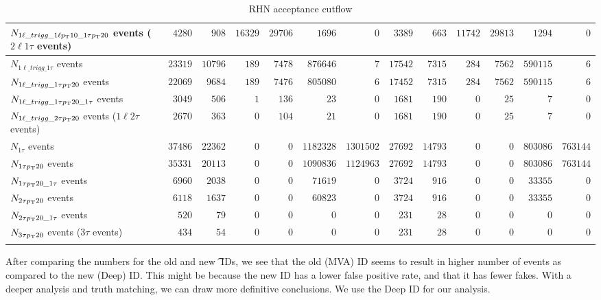 \documentclass[letterpaper,12pt]{article}
\begin{document}
\begin{table}[h]
{\begin{tabular}{l|rr|rrrr|rr|rrrr}
      \hline
      \rowcolor{red!20}
      $N_{1\ell\_trigg\_1\ell p_{\mathrm{T}}10\_1\tau p_{\mathrm{T}}20}$ events ($2\ell1\tau$ events) & $4280$ & $908$ & $16329$ & $29706$ & $1696$ & $0$ & $3389$ & $663$ & $11742$ & $29813$ & $1294$ & $0$\\
      \hline
      $N_{1\ell\_trigg\_1\tau}$ events & $23319$ & $10796$ & $189$ & $7478$ & $876646$ & $7$ & $17542$ & $7315$ & $284$ & $7562$ & $590115$ & $6$\\
      $N_{1\ell\_trigg\_1\tau p_{\mathrm{T}}20}$ events & $22069$ & $9684$ & $189$ & $7476$ & $805080$ & $6$ & $17452$ & $7315$ & $284$ & $7562$ & $590115$ & $6$\\
      $N_{1\ell\_trigg\_1\tau p_{\mathrm{T}}20\_1\tau}$ events & $3049$ & $506$ & $1$ & $136$ & $23$ & $0$ & $1681$ & $190$ & $0$ & $25$ & $7$ & $0$\\
      \hline
      \rowcolor{red!20}
      $N_{1\ell\_trigg\_2\tau p_{\mathrm{T}}20}$ events ($1\ell2\tau$ events) & $2670$ & $363$ & $0$ & $104$ & $21$ & $0$ & $1681$ & $190$ & $0$ & $25$ & $7$ & $0$\\
      \hline
      $N_{1\tau}$ events & $37486$ & $22362$ & $0$ & $0$ & $1182328$ & $1301502$ & $27692$ & $14793$ & $0$ & $0$ & $803086$ & $763144$\\
      $N_{1\tau p_{\mathrm{T}}20}$ events & $35331$ & $20113$ & $0$ & $0$ & $1090836$ & $1124963$ & $27692$ & $14793$ & $0$ & $0$ & $803086$ & $763144$\\
      $N_{1\tau p_{\mathrm{T}}20\_1\tau}$ events & $6960$ & $2038$ & $0$ & $0$ & $71619$ & $0$ & $3724$ & $916$ & $0$ & $0$ & $33355$ & $0$\\
      $N_{2\tau p_{\mathrm{T}}20}$ events & $6118$ & $1637$ & $0$ & $0$ & $60823$ & $0$ & $3724$ & $916$ & $0$ & $0$ & $33355$ & $0$\\
      $N_{2\tau p_{\mathrm{T}}20\_1\tau}$ events & $520$ & $79$ & $0$ & $0$ & $0$ & $0$ & $231$ & $28$ & $0$ & $0$ & $0$ & $0$\\
      \hline
      \rowcolor{red!20}
      $N_{3\tau p_{\mathrm{T}}20}$ events ($3\tau$ events) & $434$ & $54$ & $0$ & $0$ & $0$ & $0$ & $231$ & $28$ & $0$ & $0$ & $0$ & $0$\\
      \hline
      \arrayrulecolor{black}
      \hline
      \hline	
    \end{tabular}%
  }
  \caption{RHN acceptance cutflow}
  \label{tab:cutflow}
  \vspace{1.5cm}
\end{table}

After comparing the numbers for the old and new \t{} IDs, we see that the old (MVA) ID seems to result in higher number of events as compared to the new (Deep) ID. This might be because the new ID has a lower false positive rate, and that it has fewer fakes. With a deeper analysis and truth matching, we can draw more definitive conclusions. We use the Deep ID for our analysis.
 
\end{document}
